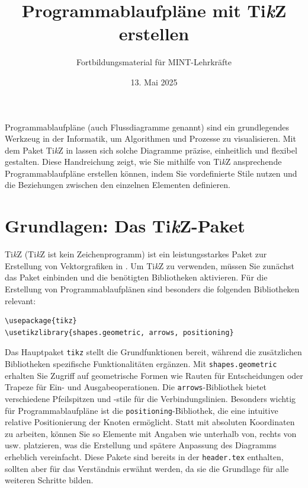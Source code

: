



\title{Programmablaufpläne mit Ti\textit{k}Z erstellen}
\author{Fortbildungsmaterial für MINT-Lehrkräfte}
\date{13. Mai 2025}
\pagestyle{plain}



\maketitle

Programmablaufpläne (auch Flussdiagramme genannt) sind ein grundlegendes Werkzeug in der Informatik, um Algorithmen und Prozesse zu visualisieren. Mit dem Paket Ti\textit{k}Z in  lassen sich solche Diagramme präzise, einheitlich und flexibel gestalten. Diese Handreichung zeigt, wie Sie mithilfe von Ti\textit{k}Z ansprechende Programmablaufpläne erstellen können, indem Sie vordefinierte Stile nutzen und die Beziehungen zwischen den einzelnen Elementen definieren.



\section{Grundlagen: Das Ti\textit{k}Z-Paket}

Ti\textit{k}Z (Ti\textit{k}Z ist kein Zeichenprogramm) ist ein leistungsstarkes Paket zur Erstellung von Vektorgrafiken in . Um Ti\textit{k}Z zu verwenden, müssen Sie zunächst das Paket einbinden und die benötigten Bibliotheken aktivieren. Für die Erstellung von Programmablaufplänen sind besonders die folgenden Bibliotheken relevant:

\begin{lstlisting}[style=latex]
\usepackage{tikz}
\usetikzlibrary{shapes.geometric, arrows, positioning}
\end{lstlisting}

Das Hauptpaket \texttt{tikz} stellt die Grundfunktionen bereit, während die zusätzlichen Bibliotheken spezifische Funktionalitäten ergänzen. Mit \texttt{shapes.geometric} erhalten Sie Zugriff auf geometrische Formen wie Rauten für Entscheidungen oder Trapeze für Ein- und Ausgabeoperationen. Die \texttt{arrows}-Bibliothek bietet verschiedene Pfeilspitzen und -stile für die Verbindungslinien. Besonders wichtig für Programmablaufpläne ist die \texttt{positioning}-Bibliothek, die eine intuitive relative Positionierung der Knoten ermöglicht. Statt mit absoluten Koordinaten zu arbeiten, können Sie so Elemente mit Angaben wie \glqq{}unterhalb von\grqq{}, \glqq{}rechts von\grqq{} usw. platzieren, was die Erstellung und spätere Anpassung des Diagramms erheblich vereinfacht. Diese Pakete sind bereits in der \texttt{header.tex} enthalten, sollten aber für das Verständnis erwähnt werden, da sie die Grundlage für alle weiteren Schritte bilden.



